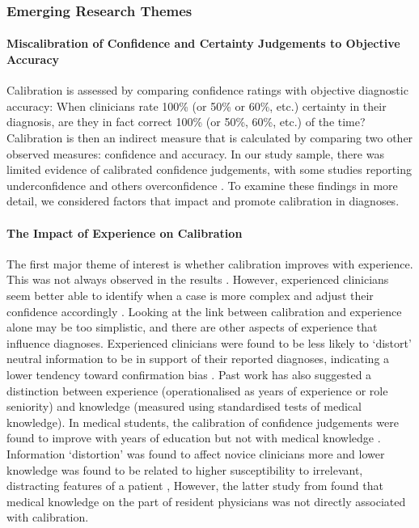 \documentclass[a4paper, nobind]{templates/ociamthesis}
\begin{document}
\subsubsection{Emerging Research Themes}\label{emerging-research-themes}

\paragraph{Miscalibration of Confidence and Certainty Judgements to Objective Accuracy}\label{miscalibration-of-confidence-and-certainty-judgements-to-objective-accuracy}

Calibration is assessed by comparing confidence ratings with objective diagnostic accuracy: When clinicians rate 100\% (or 50\% or 60\%, etc.) certainty in their diagnosis, are they in fact correct 100\% (or 50\%, 60\%, etc.) of the time? Calibration is then an indirect measure that is calculated by comparing two other observed measures: confidence and accuracy. In our study sample, there was limited evidence of calibrated confidence judgements, with some studies reporting underconfidence \autocite{mann_relationship_1993,yang_effect_2012,brezis_does_2019}and others overconfidence \autocite{friedman_are_2001,fernandez-aguilar_use_2022,garbayo_metacognitive_2023}. To examine these findings in more detail, we considered factors that impact and promote calibration in diagnoses.

\paragraph{The Impact of Experience on Calibration}\label{the-impact-of-experience-on-calibration}

The first major theme of interest is whether calibration improves with experience. This was not always observed in the results \autocite{yang_nurses_2010,clayton_are_2023}. However, experienced clinicians seem better able to identify when a case is more complex and adjust their confidence accordingly \autocite{tabak_clinical_1996,brannon_nursing_2003}. Looking at the link between calibration and experience alone may be too simplistic, and there are other aspects of experience that influence diagnoses. Experienced clinicians were found to be less likely to `distort' neutral information to be in support of their reported diagnoses, indicating a lower tendency toward confirmation bias \autocite{kostopoulou_information_2012}. Past work has also suggested a distinction between experience (operationalised as years of experience or role seniority) and knowledge (measured using standardised tests of medical knowledge). In medical students, the calibration of confidence judgements were found to improve with years of education but not with medical knowledge \autocite{hautz_diagnostic_2019}. Information `distortion' was found to affect novice clinicians more \autocite{kostopoulou_information_2012} and lower knowledge was found to be related to higher susceptibility to irrelevant, distracting features of a patient \autocite{mamede_role_2024}, However, the latter study from \textcite{mamede_role_2024} found that medical knowledge on the part of resident physicians was not directly associated with calibration.
\end{document}
